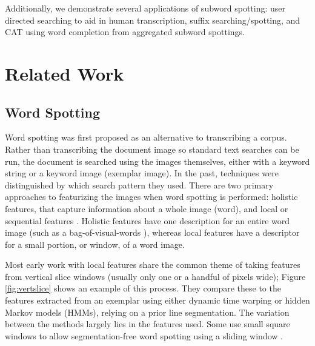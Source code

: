 \documentclass[ms,electronic,twosidetoc,letterpaper,chaptercenter,parttop,lof,lot]{byumsphd}
\begin{document}
Additionally, we demonstrate several applications of subword spotting: user directed searching to aid in human transcription, suffix searching/spotting, and CAT using word completion from aggregated subword spottings.

\chapter{Related Work}\label{relatedwork}

\section{Word Spotting}\label{relatedwork_wordspotting}


Word spotting was first proposed as an alternative to transcribing a corpus. Rather than transcribing the document image so standard text searches can be run, the document is searched using the images themselves, either with a keyword string or a keyword image (exemplar image). In the past, techniques were distinguished by which search pattern they used. There are two primary approaches to featurizing the images when word spotting is performed: holistic features, that capture information about a whole image (word), and local or sequential features \cite{Rodrıguez2008}. Holistic features have one description for an entire word image (such as a bag-of-visual-words \cite{Shekhar2012}), whereas local features have a descriptor for a small portion, or window, of a word image. 

Most early work with local features share the common theme of taking features from vertical slice windows (usually only one or a handful of pixels wide); Figure \ref{fig:vertslice} shows an example of this process. They compare these to the features extracted from an exemplar using either dynamic time warping or hidden Markov models (HMMs), relying on a prior line segmentation. The variation between the methods largely lies in the features used. Some use small square windows to allow segmentation-free word spotting using a sliding window \cite{Rothacker2013}.
\end{document}
